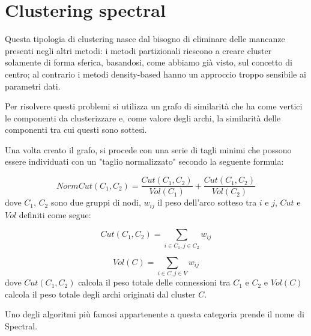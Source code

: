 \section{Clustering spectral}
	Questa tipologia di clustering nasce dal bisogno di eliminare delle mancanze presenti negli altri metodi: i metodi partizionali riescono a creare cluster solamente di forma sferica, basandosi, come abbiamo già visto, sul concetto di centro; al contrario i metodi density-based hanno un approccio troppo sensibile ai parametri dati.

	Per risolvere questi problemi si utilizza un grafo di similarità che ha come vertici le componenti da clusterizzare e, come valore degli archi, la similarità delle componenti tra cui questi sono sottesi.

	Una volta creato il grafo, si procede con una serie di tagli minimi che possono essere individuati con un "taglio normalizzato" secondo la seguente formula:

	\begin{equation*}
		NormCut(C_1, C_2) =  \frac{Cut(C_1, C_2)}{Vol(C_1)} + \frac{Cut(C_1, C_2)}{Vol(C_2)}
	\end{equation*}
	dove $C_1$, $C_2$ sono due gruppi di nodi,  $w_{ij}$ il peso dell'arco sotteso tra $i$ e $j$, $Cut$ e $Vol$ definiti come segue:

	\begin{equation*}
		Cut(C_1, C_2) = \sum_{i \in C_1, j \in C_2} {w_{ij}}
	\end{equation*}

	\begin{equation*}
		Vol(C) = \sum_{i \in C, j \in V} {w_{ij}}
	\end{equation*}
	dove $Cut(C_1, C_2)$ calcola il peso totale delle connessioni tra $C_1$ e $C_2$ e $Vol(C)$ calcola il peso totale degli archi originati dal cluster $C$.

	Uno degli algoritmi più famosi appartenente a questa categoria prende il nome di Spectral\cite{spectral}.